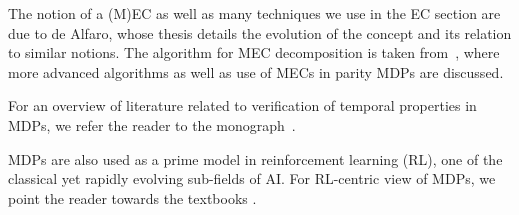  The notion of a (M)EC as well as many techniques we use in the EC section are due to de Alfaro, whose thesis \cite{dA:1997} details the evolution of the concept and its relation to similar notions. The algorithm for MEC decomposition is taken from~\cite{Chatterjee&Henzinger:2011}, where more advanced algorithms as well as use of MECs in parity MDPs are discussed.

For an overview of literature related to verification of temporal properties in MDPs, we refer the reader to the monograph~\cite{Baier&Katoen:2008}.

MDPs are also used as a prime model in reinforcement learning (RL), one of the classical yet rapidly evolving sub-fields of AI. For RL-centric view of MDPs, we point the reader towards the textbooks \cite{Sutton&Barto:2018,Bertsekas:2017}.
